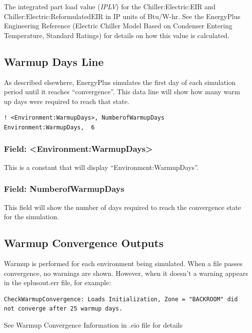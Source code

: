 The integrated part load value (\emph{IPLV}) for the Chiller:Electric:EIR and Chiller:Electric:ReformulatedEIR in IP units of Btu/W-hr. See the EnergyPlus Engineering Reference (Electric Chiller Model Based on Condenser Entering Temperature, Standard Ratings) for details on how this value is calculated.

\subsection{Warmup Days Line}

As described elsewhere, EnergyPlus simulates the first day of each simulation period until it reaches “convergence”. This data line will show how many warm up days were required to reach that state.

\begin{lstlisting}
! <Environment:WarmupDays>, NumberofWarmupDays
Environment:WarmupDays,  6
\end{lstlisting}

\subsubsection{Field: <Environment:WarmupDays>}

This is a constant that will display ``Environment:WarmupDays''.

\subsubsection{Field: NumberofWarmupDays}

This field will show the number of days required to reach the convergence state for the simulation.

\subsection{Warmup Convergence Outputs}

Warmup is performed for each environment being simulated. When a file passes convergence, no warnings are shown.  However, when it doesn’t a warning appears in the eplusout.err file, for example:

\begin{lstlisting}
CheckWarmupConvergence: Loads Initialization, Zone = "BACKROOM" did not converge after 25 warmup days.
\end{lstlisting}

See Warmup Convergence Information in .eio file for details


